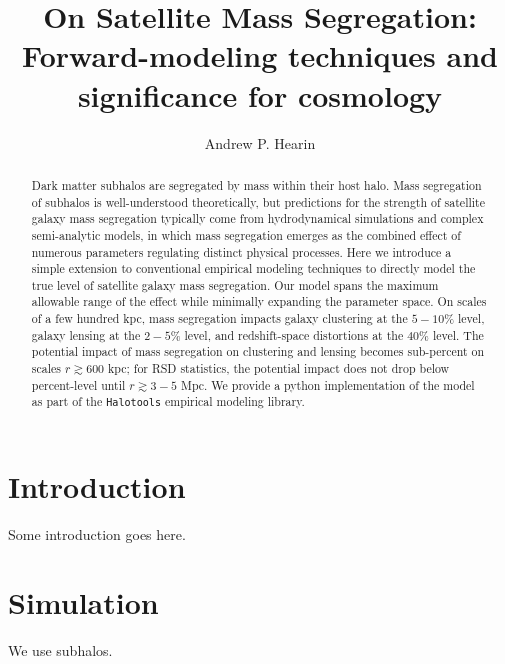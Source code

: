 \documentclass[usenatbib,usegraphicx,letterpaper]{mn2e}
\begin{document}
\title[Forward-modeling satellite mass segregation]
{On Satellite Mass Segregation: Forward-modeling techniques and significance for cosmology}

\author[A.P. Hearin]{Andrew P. Hearin}

\maketitle

\begin{abstract}
Dark matter subhalos are segregated by mass within their host halo. Mass segregation of subhalos is well-understood theoretically, but predictions for the strength of satellite galaxy mass segregation typically come from hydrodynamical simulations and complex semi-analytic models, in which mass segregation emerges as the combined effect of numerous parameters regulating distinct physical processes. Here we introduce a simple extension to conventional empirical modeling techniques to directly model the true level of satellite galaxy mass segregation. Our model spans the maximum allowable range of the effect while minimally expanding the parameter space. On scales of a few hundred kpc, mass segregation impacts galaxy clustering at the $5-10\%$ level, galaxy lensing at the $2-5\%$ level, and redshift-space distortions at the $40\%$ level. The potential impact of mass segregation on clustering and lensing becomes sub-percent on scales $r\gtrsim 600$ kpc; for RSD statistics, the potential impact does not drop below percent-level until $r\gtrsim 3-5$ Mpc. We provide a python implementation of the model as part of the {\tt Halotools} empirical modeling library. 
\end{abstract}

\section{Introduction}
Some introduction goes here.

\section{Simulation}
We use  \citet{rockstar} subhalos. 

 

\end{document}
